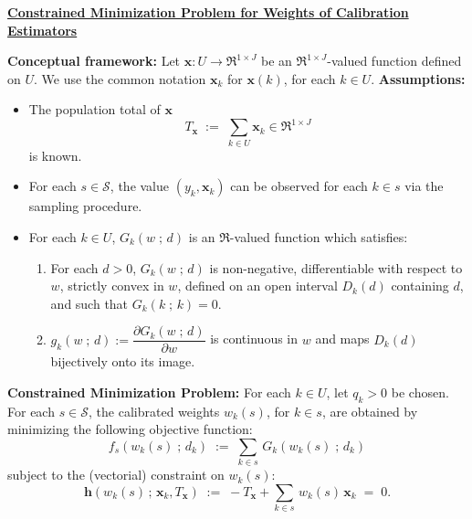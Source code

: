 \documentclass{article}
\begin{document}
\begin{center}
\begin{minipage}{6.0in}
\begin{center}
\textbf{\large\underline{Constrained Minimization Problem for Weights of Calibration Estimators}}
\end{center}
\noindent
\textbf{Conceptual framework:}\;\;
Let $\mathbf{x} : U \longrightarrow \Re^{1 \times J}$ be an $\Re^{1 \times J}$-valued
function defined on $U$.
We use the common notation $\mathbf{x}_{k}$ for $\mathbf{x}(k)$, for each $k \in U$.
\vskip 0.3cm
\noindent
\textbf{Assumptions:}
\begin{itemize}
\item	The population total of $\mathbf{x}$
		\begin{equation*} T_{\mathbf{x}} \; := \; \sum_{k \in U} \mathbf{x}_{k} \in \Re^{1\times J} \end{equation*}
		is known.
\item	For each $s \in \mathcal{S}$, the value $(y_{k},\mathbf{x}_{k})$ can be observed for each $k \in s$
		via the sampling procedure.
\item	For each $k \in U$, $G_{k}(w\;;\,d)$ is an $\Re$-valued function which satisfies:
		\begin{enumerate}
		\item	For each $d > 0$, $G_{k}(w\;;\,d)$ is non-negative, differentiable with respect to $w$,
				strictly convex in $w$, defined on an open interval $D_{k}(d)$ containing $d$, and
				such that $G_{k}(k\;;\,k) = 0$.
		\item	$g_{k}(w\;;\,d) := \dfrac{\partial G_{k}(w\;;\,d)}{\partial w}$ is continuous in $w$ and maps
				$D_{k}(d)$ bijectively onto its image.
		\end{enumerate}
\end{itemize}
\vskip 0.3cm
\noindent
\textbf{Constrained Minimization Problem:}\;\;
For each $k \in U$, let $q_{k} > 0$ be chosen.
For each $s \in \mathcal{S}$, the calibrated weights $w_{k}(s)$, for $k \in s$, are obtained
by minimizing the following objective function:
\begin{equation*}
f_{s}(w_{k}(s)\;;\,d_{k})
\;:=\;\sum_{k \in s}\,G_{k}(w_{k}(s)\;;\,d_{k})
\end{equation*}
subject to the (vectorial) constraint on $w_{k}(s)$:
\begin{equation*}
\mathbf{h}(w_{k}(s)\,;\,\mathbf{x}_{k},T_{\mathbf{x}})
\;:=\; - T_{\mathbf{x}} + \sum_{k \in s}\, w_{k}(s)\,\mathbf{x}_{k} \; = \; 0.
\end{equation*}
\end{minipage}
\end{center}
\end{document}
